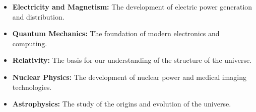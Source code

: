 \begin{itemize}
    \item \textbf{Electricity and Magnetism:} The development of electric power generation and distribution.
    \item \textbf{Quantum Mechanics:} The foundation of modern electronics and computing.
    \item \textbf{Relativity:} The basis for our understanding of the structure of the universe.
    \item \textbf{Nuclear Physics:} The development of nuclear power and medical imaging technologies.
    \item \textbf{Astrophysics:} The study of the origins and evolution of the universe.
    
\end{itemize}
